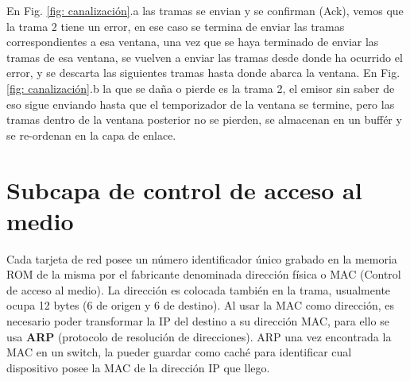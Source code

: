 \documentclass[
	12pt, %
	fleqn, %
	a4paper, %
]{LegrandOrangeBook}
\begin{document}
En Fig. \ref{fig: canalización}.a las tramas se envian y se confirman (Ack), vemos que la trama 2 tiene un error, en ese caso se termina de enviar las tramas correspondientes a esa ventana, una vez que se haya terminado de enviar las tramas de esa ventana, se vuelven a enviar las tramas desde donde ha ocurrido el error, y se descarta las siguientes tramas hasta donde abarca la ventana. En Fig. \ref{fig: canalización}.b la que se daña o pierde es la trama 2, el emisor sin saber de eso sigue enviando hasta que el temporizador de la ventana se termine, pero las tramas dentro de la ventana posterior no se pierden, se almacenan en un buffér y se re-ordenan en la capa de enlace.
\chapter{Subcapa de control de acceso al medio}
Cada tarjeta de red posee un número identificador único grabado en la memoria ROM de la misma por el fabricante denominada dirección física o MAC (Control de acceso al medio). La dirección es colocada también en la trama, usualmente ocupa 12 bytes (6 de origen y 6 de destino). Al usar la MAC como dirección, es necesario poder transformar la IP del destino a su dirección MAC, para ello se usa \textbf{ARP} (protocolo de resolución de direcciones). ARP una vez encontrada la MAC en un switch, la pueder guardar como caché para identificar cual dispositivo posee la MAC de la dirección IP que llego.
\end{document}
